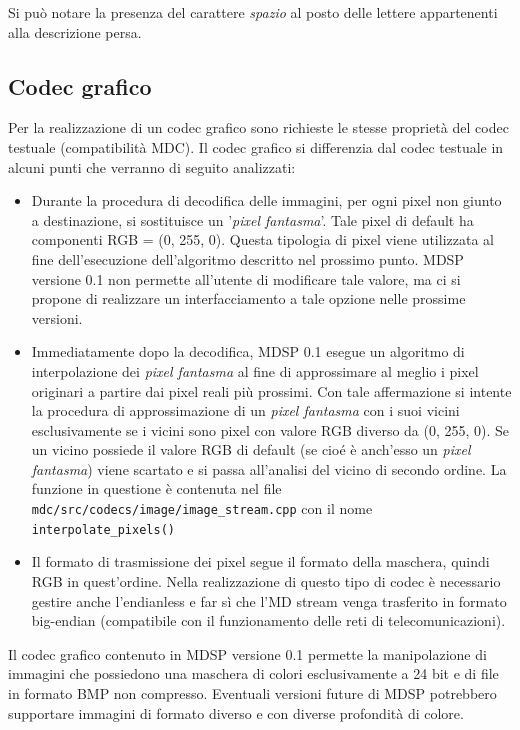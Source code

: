Si può notare la presenza del carattere \emph{spazio} al posto delle lettere
appartenenti alla descrizione persa.

\subsection{Codec grafico}
Per la realizzazione di un codec grafico sono richieste le stesse proprietà del
codec testuale (compatibilità MDC). Il codec grafico si differenzia dal codec
testuale in alcuni punti che verranno di seguito analizzati:

\begin{itemize}
  \item Durante la procedura di decodifica delle immagini, per ogni pixel
  non giunto a destinazione, si sostituisce un '\emph{pixel
  fantasma}'. Tale pixel di default ha componenti RGB = (0, 255, 0). Questa
  tipologia di pixel viene utilizzata al fine dell'esecuzione dell'algoritmo
  descritto nel prossimo punto. MDSP versione 0.1 non permette all'utente di
  modificare tale valore, ma ci si propone di realizzare un interfacciamento a tale opzione nelle prossime versioni.
  \item Immediatamente dopo la decodifica, MDSP 0.1 esegue un algoritmo di
  interpolazione dei \emph{pixel fantasma} al fine di approssimare al meglio i
  pixel originari a partire dai pixel reali più prossimi. Con tale affermazione
  si intente la procedura di approssimazione di un \emph{pixel fantasma} con i
  suoi vicini esclusivamente se i vicini sono pixel con valore RGB diverso da
  (0, 255, 0). Se un vicino possiede il valore RGB di default (se cioé è
  anch'esso un \emph{pixel fantasma}) viene scartato e si passa all'analisi del vicino di
  secondo ordine. La funzione in questione è contenuta nel file
  \texttt{mdc/src/codecs/image/image\_stream.cpp} con il nome
  \texttt{interpolate\_pixels()}
  \item Il formato di trasmissione dei pixel segue il formato della maschera,
  quindi RGB in quest'ordine. Nella realizzazione di questo tipo di codec è
  necessario gestire anche l'endianless e far sì che l'MD stream venga
  trasferito in formato big-endian (compatibile con il funzionamento delle reti
  di telecomunicazioni).
\end{itemize}

Il codec grafico contenuto in MDSP versione 0.1 permette la manipolazione di
immagini che possiedono una maschera di colori esclusivamente a 24 bit e di
file in formato BMP non compresso. Eventuali versioni future di MDSP potrebbero
supportare immagini di formato diverso e con diverse profondità di colore.

